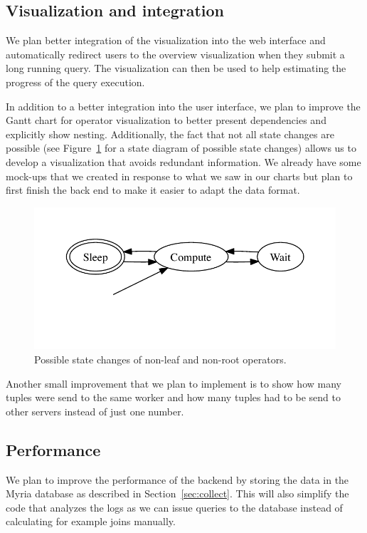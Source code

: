 \documentclass[11pt]{scrartcl}
\begin{document}
\subsection{Visualization and integration}
\label{sec:vizimprovement}

We plan better integration of the visualization into the web interface and automatically redirect users to the overview visualization when they submit a long running query. The visualization can then be used to help estimating the progress of the query execution.

In addition to a better integration into the user interface, we plan to improve the Gantt chart for operator visualization to better present dependencies and explicitly show nesting. Additionally, the fact that not all state changes are possible (see Figure~\ref{fig:states} for a state diagram of possible state changes) allows us to develop a visualization that avoids redundant information. We already have some mock-ups that we created in response to what we saw in our charts but plan to first finish the back end to make it easier to adapt the data format.

\begin{figure}[h]
  \begin{center}
    \includegraphics[width=.5\textwidth]{states.pdf}
  \end{center}
  \caption{Possible state changes of non-leaf and non-root operators.}
  \label{fig:states}
\end{figure}

Another small improvement that we plan to implement is to show how many tuples were send to the same worker and how many tuples had to be send to other servers instead of just one number.


\subsection{Performance}
\label{sec:performance}

We plan to improve the performance of the backend by storing the data in the Myria database as described in Section~\ref{sec:collect}. This will also simplify the code that analyzes the logs as we can issue queries to the database instead of calculating for example joins manually.
\end{document}
